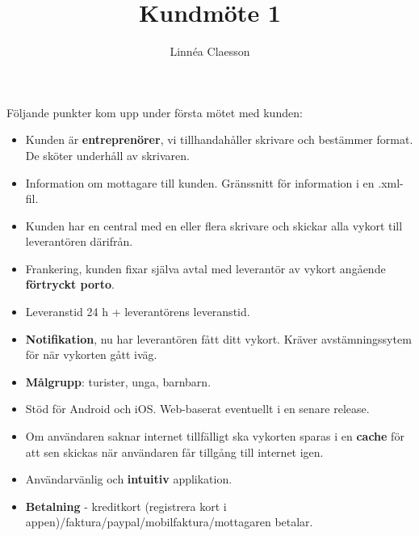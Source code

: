 \documentclass[10pt,a4paper]{article}
\author{Linnéa Claesson}
\title{Kundmöte 1}
\begin{document}
\maketitle

Följande punkter kom upp under första mötet med kunden:

\begin{itemize}
\item Kunden är \textbf{entreprenörer}, vi tillhandahåller skrivare och bestämmer format. De sköter underhåll av skrivaren.

\item Information om mottagare till kunden. Gränssnitt för information i en .xml-fil. 

\item Kunden har en central med en eller flera skrivare och skickar alla vykort till leverantören därifrån.

\item Frankering, kunden fixar själva avtal med leverantör av vykort angående \textbf{förtryckt porto}.

\item Leveranstid 24 h + leverantörens leveranstid.

\item \textbf{Notifikation}, nu har leverantören fått ditt vykort. Kräver avstämningssytem för när vykorten gått iväg.

\item \textbf{Målgrupp}: turister, unga, barnbarn.

\item Stöd för Android och iOS. Web-baserat eventuellt i en senare release.

\item Om användaren saknar internet tillfälligt ska vykorten sparas i en \textbf{cache} för att sen skickas när användaren får tillgång till internet igen.

\item Användarvänlig och \textbf{intuitiv} applikation.

\item \textbf{Betalning} - kreditkort (registrera kort i appen)/faktura/paypal/mobilfaktura/mottagaren betalar.
\end{itemize}
\end{document}
